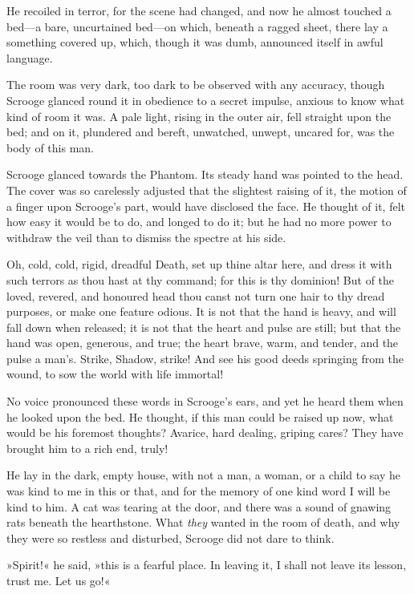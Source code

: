 He recoiled in terror, for the scene had changed, and now he almost touched a bed—a bare, uncurtained bed—on which, beneath a ragged sheet, there lay a something covered up, which, though it was dumb, announced itself in awful language.

The room was very dark, too dark to be observed with any accuracy, though Scrooge glanced round it in obedience to a secret impulse, anxious to know what kind of room it was. A pale light, rising in the outer air, fell straight upon the bed; and on it, plunder\-ed and bereft, unwatched, unwept, uncared for, was the body of this man.

Scrooge glanced towards the Phantom. Its steady hand was pointed to the head. The cover was so carelessly adjusted that the slightest raising of it, the motion of a finger upon Scrooge's part, would have disclosed the face. He thought of it, felt how easy it would be to do, and longed to do it; but he had no more power to withdraw the veil than to dismiss the spectre at his side.

Oh, cold, cold, rigid, dreadful Death, set up thine altar here, and dress it with such terrors as thou hast at thy command; for this is thy dominion! But of the loved, revered, and honoured head thou canst not turn one hair to thy dread purposes, or make one feature odious. It is not that the hand is heavy, and will fall down when released; it is not that the heart and pulse are still; but that the hand was open, generous, and true; the heart brave, warm, and tender, and the pulse a man's. Strike, Shadow, strike! And see his good deeds springing from the wound, to sow the world with life immortal!

No voice pronounced these words in Scrooge's ears, and yet he heard them when he looked upon the bed. He thought, if this man could be raised up now, what would be his foremost thoughts? Avarice, hard dealing, griping cares? They have brought him to a rich end, truly!

He lay in the dark, empty house, with not a man, a woman, or a child to say he was kind to me in this or that, and for the memory of one kind word I will be kind to him. A cat was tearing at the door, and there was a sound of gnawing rats beneath the hearthstone. What \textit{they} wanted in the room of death, and why they were so restless and disturbed, Scrooge did not dare to think.

»Spirit!« he said, »this is a fearful place. In leaving it, I shall not leave its lesson, trust me. Let us go!«

